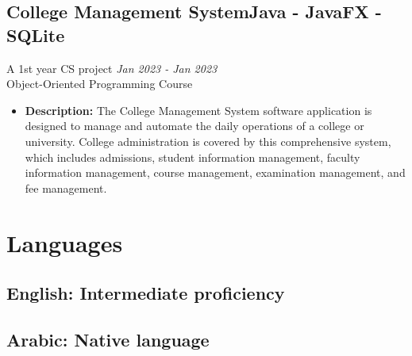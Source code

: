\documentclass[a4paper,12pt]{article}
\begin{document}
		 \subsection{{College Management System}\textmd{\hfill \normalsize{Java - JavaFX - SQLite}}}
			\vspace{-3mm}
			A 1st year CS project \hfill \small\textit{Jan 2023 - Jan 2023}\\
			Object-Oriented Programming Course
			\begin{itemize}
				\item{\textbf{Description: }The College Management System software application is designed to manage and automate the daily operations of a college or university. College administration is covered by this comprehensive system, which includes admissions, student information management, faculty information management, course management, examination management, and fee management. }
			\end{itemize}	

	\section{Languages}
		\subsection{\normalsize{English: \textmd\small{Intermediate proficiency}}}
		\subsection{\normalsize{Arabic: \textmd\small{Native language}}}	
\end{document}
